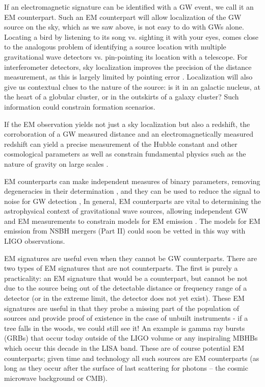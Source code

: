 If an electromagnetic signature can be identified with a GW event, we call it
an EM counterpart. Such an EM counterpart will allow localization of the GW
source on the sky, which as we saw above, is not easy to do with GWs alone.
Locating a bird by listening to its song vs. sighting it with your eyes, comes
close to the analogous problem of identifying a source location with multiple
gravitational wave detectors vs. pin-pointing its location with a telescope.
For interferometer detectors, sky localization improves the
precision of the distance measurement, as this is largely limited by pointing
error \citep{Cutler:1998, Hughes:2002}. Localization will also give us contextual
clues to the nature of the source: is it in an galactic nucleus, at the heart
of a globular cluster, or in the outskirts of a galaxy cluster? Such
information could constrain formation scenarios.

If the EM observation yields not just a sky localization but also a redshift,
the corroboration of a GW measured distance and an electromagnetically
measured redshift can yield a precise measurement of the Hubble constant and
other cosmological parameters \citep{Schutz:1986, KrolakSchutz:1987,
ChernoffFinn:1993, Schutz:2002, HolzHughes:2005, Dalal:2006, Kocsis:StndSirens:2006,
CutlerHolz:2009,  Nissanke:GRBStndSirens:2010, Nishizawa:StndSirens:2011, Taylor:StndSirens:2012,
Tamanini:2016} as well as constrain fundamental physics such as the nature of
gravity on large scales \citep{Deffayet:2007, Camera:StndSirens:2013}.

EM counterparts can make independent measures of binary parameters, removing
degeneracies in their determination \citep{HughesHolz:2003}, and they can be
used to reduce the signal to noise for GW detection \citep{KochanekPiran:1993,
HarryFairhurst:2011}, In general, EM counterparts are vital to determining the
astrophysical context of gravitational wave sources, allowing independent GW
and EM measurements to constrain models for EM emission \citep{Phinney:2009,
MandelO'Sh:2010}. The models for EM emission from NSBH mergers (Part II) could
soon be vetted in this way with LIGO observations.


EM signatures are useful even when they cannot be GW counterparts. There are
two types of EM signatures that are not counterparts. The first is 
purely a practicality: an EM signature that would be a counterpart, but cannot
be not due to the source being out of the detectable distance or frequency
range of a detector (or in the extreme limit, the detector does not yet
exist). These EM signatures are useful in that they probe a missing part of
the population of sources and provide proof of existence in the case of
unbuilt instruments - if a tree falls in the woods, we could still see it! An
example is gamma ray bursts (GRBs) that occur today outside of the LIGO volume
or any inspiraling MBHBs which occur this decade in the LISA band. These are
of course potential EM counterparts; given time and technology all such
sources are EM counterparts (as long as they occur after the surface of last
scattering for photons -- the cosmic microwave background or CMB).


